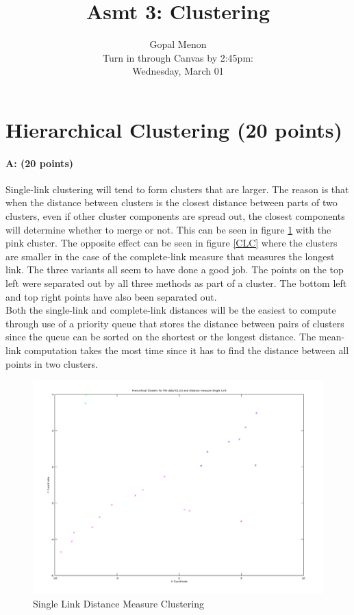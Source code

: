 \documentclass[11pt]{article}
\title{Asmt 3: Clustering}
\author{Gopal Menon\\Turn in through Canvas by 2:45pm: \\
Wednesday, March 01}
\date{}
\begin{document}
\maketitle



\section{Hierarchical Clustering (20 points)}

\paragraph{A: (20 points)} 

Single-link clustering will tend to form clusters that are larger. The reason is that when the distance between clusters is the closest distance between parts of two clusters, even if other cluster components are spread out, the closest components will determine whether to merge or not. This can be seen in figure \ref{SLC} with the pink cluster. The opposite effect can be seen in figure \ref{CLC} where the clusters are smaller in the case of the complete-link measure that measures the longest link. The three variants all seem to have done a good job. The points on the top left were separated out by all three methods as part of a cluster. The bottom left and top right points have also been separated out.\\

Both the single-link and complete-link distances will be the easiest to compute through use of a priority queue that stores the distance between pairs of clusters since the queue can be sorted on the shortest or the longest distance. The mean-link computation takes the most time since it has to find the distance between all points in two clusters.

\begin{figure}[!htb]
\centering
\includegraphics[width=5in]{figures/1ASingleLink.png}
\caption{Single Link Distance Measure Clustering}
\label{SLC}
\end{figure}
 
\end{document}
